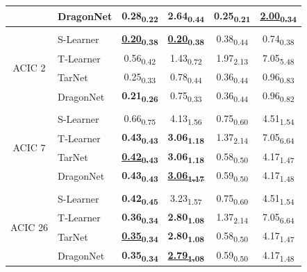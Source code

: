 \begin{table}
\begin{tabular}{c l cc cc}
& DragonNet  & \textbf{0.28\textsubscript{0.22}} & \textbf{2.64\textsubscript{0.44}} & \textbf{0.25\textsubscript{0.21}} & \underline{\textbf{2.00\textsubscript{0.34}}} \\
 \hline \\[-1.5ex]
\multirow{4}{*}{ACIC 2}
& S-Learner  & \underline{\textbf{0.20\textsubscript{0.38}}} & \underline{\textbf{0.20\textsubscript{0.38}}} & 0.38\textsubscript{0.44} & 0.74\textsubscript{0.38} \\
& T-Learner  & 0.56\textsubscript{0.42} & 1.43\textsubscript{0.72} & 1.97\textsubscript{2.13} & 7.05\textsubscript{5.48} \\
& TarNet     & 0.25\textsubscript{0.33} & 0.78\textsubscript{0.44} & 0.36\textsubscript{0.44} & 0.96\textsubscript{0.83} \\
& DragonNet  & \textbf{0.21\textsubscript{0.26}} & 0.75\textsubscript{0.33} & 0.36\textsubscript{0.44} & 0.96\textsubscript{0.82} \\
\hline \\[-1.5ex]
\multirow{4}{*}{ACIC 7}
& S-Learner  & 0.66\textsubscript{0.75} & 4.13\textsubscript{1.56} & 0.75\textsubscript{0.60} & 4.51\textsubscript{1.54} \\
& T-Learner  & \textbf{0.43\textsubscript{0.43}} & \textbf{3.06\textsubscript{1.18}} & 1.37\textsubscript{2.14} & 7.05\textsubscript{6.64} \\
& TarNet     & \underline{\textbf{0.42\textsubscript{0.43}}} & \textbf{3.06\textsubscript{1.18}} & 0.58\textsubscript{0.50} & 4.17\textsubscript{1.47} \\
& DragonNet  & \textbf{0.43\textsubscript{0.43}} & \underline{\textbf{3.06\textsubscript{1.17}}} & 0.59\textsubscript{0.50} & 4.17\textsubscript{1.48} \\
 \hline \\[-1.5ex]
\multirow{4}{*}{ACIC 26}
& S-Learner  & \textbf{0.42\textsubscript{0.45}} & 3.23\textsubscript{1.57} & 0.75\textsubscript{0.60} & 4.51\textsubscript{1.54} \\
& T-Learner  & \textbf{0.36\textsubscript{0.34}} & \textbf{2.80\textsubscript{1.08}} & 1.37\textsubscript{2.14} & 7.05\textsubscript{6.64} \\
& TarNet     & \underline{\textbf{0.35\textsubscript{0.34}}} & \textbf{2.80\textsubscript{1.08}} & 0.58\textsubscript{0.50} & 4.17\textsubscript{1.47} \\
& DragonNet  & \textbf{0.35\textsubscript{0.34}} & \underline{\textbf{2.79\textsubscript{1.08}}} & 0.59\textsubscript{0.50} & 4.17\textsubscript{1.48} \\

\end{tabular}
\end{table}
